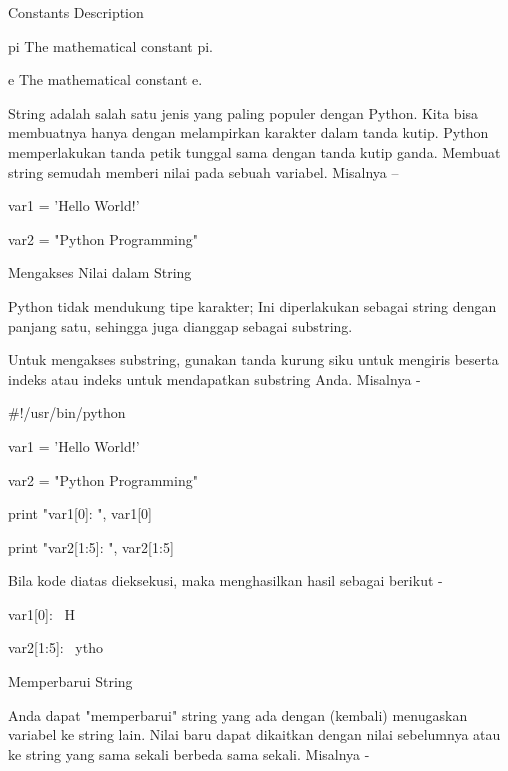 Constants \hspace*{0.5in} Description \par
pi \hspace*{0.5in} The mathematical constant pi. \par
e \hspace*{0.5in} The mathematical constant e. \par
\vspace{12pt}
String adalah salah satu jenis yang paling populer dengan Python. Kita bisa membuatnya hanya dengan melampirkan karakter dalam tanda kutip. Python memperlakukan tanda petik tunggal sama dengan tanda kutip ganda. Membuat string semudah memberi nilai pada sebuah variabel. Misalnya – \par
\vspace{12pt}
var1 = 'Hello World!' \par
var2 = "Python Programming" \par
\vspace{12pt}
Mengakses Nilai dalam String \par
\vspace{12pt}
Python tidak mendukung tipe karakter; Ini diperlakukan sebagai string dengan panjang satu, sehingga juga dianggap sebagai substring. \par
Untuk mengakses substring, gunakan tanda kurung siku untuk mengiris beserta indeks atau indeks untuk mendapatkan substring Anda. Misalnya - \par
\vspace{12pt}
 $  \#  $!/usr/bin/python \par
\vspace{12pt}
var1 = 'Hello World!' \par
var2 = "Python Programming" \par
\vspace{12pt}
print "var1[0]: ", var1[0] \par
print "var2[1:5]: ", var2[1:5] \par
\vspace{12pt}
Bila kode diatas dieksekusi, maka menghasilkan hasil sebagai berikut - \par
\vspace{12pt}
var1[0]:~ H \par
var2[1:5]:~ ytho \par
Memperbarui String \par
\vspace{12pt}
Anda dapat "memperbarui" string yang ada dengan (kembali) menugaskan variabel ke string lain. Nilai baru dapat dikaitkan dengan nilai sebelumnya atau ke string yang sama sekali berbeda sama sekali. Misalnya - \par
